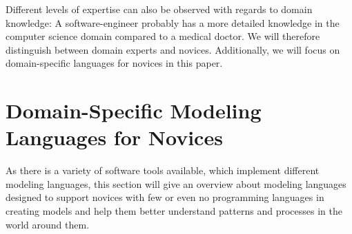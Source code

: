 \documentclass[runningheads,a4paper]{llncs}
\begin{document}
 Different levels of expertise can also be observed with regards to domain knowledge:
 A software-engineer probably has a more detailed knowledge in the computer science domain compared to a medical doctor.
 We will therefore distinguish between domain experts and novices. 
 Additionally, we will focus on domain-specific languages for novices in this paper.
%  
 
 \section{Domain-Specific Modeling Languages for Novices}
 As there is a variety of software tools available, which implement different modeling languages, this section will give an overview 
 about modeling languages designed to support novices with few or even no programming languages in creating models and help them better 
 understand patterns and processes in the world around them.
 
\end{document}
